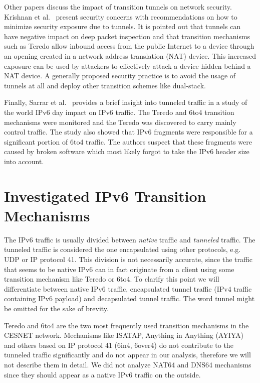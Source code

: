 Other papers discuss the impact of transition tunnels on network security. Krishnan et al.~\cite{rfc6169} present security concerns with recommendations on how to minimize security exposure due to tunnels. It is pointed out that tunnels can have negative impact on deep packet inspection and that transition mechanisms such as Teredo allow inbound access from the public Internet to a device through an opening created in a network address translation (NAT) device. This increased exposure can be used by attackers to effectively attack a device hidden behind a NAT device. A generally proposed security practice is to avoid the usage of tunnels at all and deploy other transition schemes like dual-stack.

Finally, Sarrar et al.~\cite{sarrar} provides a brief insight into tunneled traffic in a study of the world IPv6 day impact on IPv6 traffic. The Teredo and 6to4 transition mechanisms were monitored and the Teredo was discovered to carry mainly control traffic. The study also showed that IPv6 fragments were responsible for a significant portion of 6to4 traffic. The authors suspect that these fragments were caused by broken software which most likely forgot to take the IPv6 header size into account.

\section{Investigated IPv6 Transition Mechanisms} \label{subsec:ipv6-tunnel-traffic}

The IPv6 traffic is usually divided between \emph{native} traffic and \emph{tunneled} traffic. The tunneled traffic is considered the one encapsulated using other protocols, e.g. UDP or IP protocol 41. This division is not necessarily accurate, since the traffic that seems to be native IPv6 can in fact originate from a client using some transition mechanism like Teredo or 6to4. To clarify this point we will differentiate between native IPv6 traffic, encapsulated tunnel traffic (IPv4 traffic containing IPv6 payload) and decapsulated tunnel traffic. The word tunnel might be omitted for the sake of brevity. 

Teredo and 6to4 are the two most frequently used transition mechanisms in the CESNET network. Mechanisms like ISATAP, Anything in Anything (AYIYA) and others based on IP protocol 41 (6in4, 6over4) do not contribute to the tunneled traffic significantly and do not appear in our analysis, therefore we will not describe them in detail. We did not analyze NAT64 and DNS64 mechanisms since they should appear as a native IPv6 traffic on the outside.


